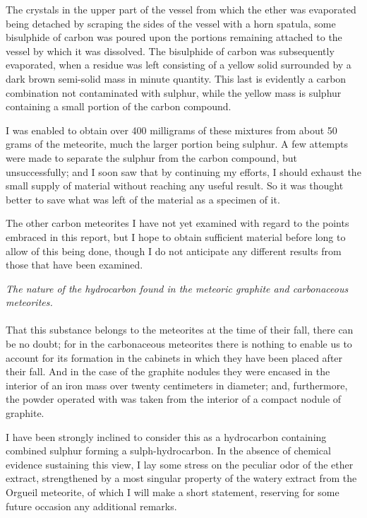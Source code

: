 \documentclass[a4paper, 11pt, oneside, english]{article}
\begin{document}
The crystals in the upper part of the vessel from which the ether was evaporated being detached by scraping the sides of the vessel with a horn spatula, some bisulphide of carbon was poured upon the portions remaining attached to the vessel by which it was dissolved. The bisulphide of carbon was subsequently evaporated, when a residue was left consisting of a yellow solid surrounded by a dark brown semi-solid mass in minute quantity. This last is evidently a carbon combination not contaminated with sulphur, while the yellow mass is sulphur containing a small portion of the carbon compound.

I was enabled to obtain over 400 milligrams of these mixtures from about 50 grams of the meteorite, much the larger portion being sulphur. A few attempts were made to separate the sulphur from the carbon compound, but unsuccessfully; and I soon saw that by continuing my efforts, I should exhaust the small supply of material without reaching any useful result. So it was thought better to save what was left of the material as a specimen of it.

The other carbon meteorites I have not yet examined with regard to the points embraced in this report, but I hope to obtain sufficient material before long to allow of this being done, though I do not anticipate any different results from those that have been examined.
\begin{center}
\emph{The nature of the hydrocarbon found in the meteoric graphite and carbonaceous meteorites.}
\end{center}
\paragraph{}
That this substance belongs to the meteorites at the time of their fall, there can be no doubt; for in the carbonaceous meteorites there is nothing to enable us to account for its formation in the cabinets in which they have been placed after their fall. And in the case of the graphite nodules they were encased in the interior of an iron mass over twenty centimeters in diameter; and, furthermore, the powder operated with was taken from the interior of a compact nodule of graphite.

I have been strongly inclined to consider this as a hydrocarbon containing combined sulphur forming a sulph-hydrocarbon. In the absence of chemical evidence sustaining this view, I lay some stress on the peculiar odor of the ether extract, strengthened by a most singular property of the watery extract from the Orgueil meteorite, of which I will make a short statement, reserving for some future occasion any additional remarks.
\end{document}
